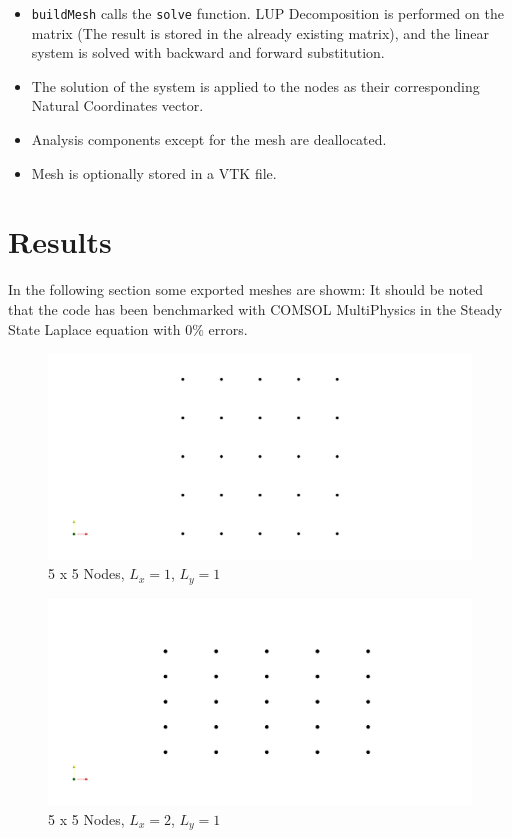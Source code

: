 \documentclass{article}
\begin{document}
\begin{itemize}
\begin{itemize}
 		
 			\end{itemize}
 			
 		
 			
 			\item \texttt{buildMesh} calls the \texttt{solve} function. LUP Decomposition is performed on the matrix (The result is stored in the already existing matrix), and the linear system is solved with backward and forward substitution.
 			\item The solution of the system is applied to the nodes as their corresponding Natural Coordinates vector.
 			\item Analysis components except for the mesh are deallocated.
 			\item Mesh is optionally stored in a VTK file.
 		
 		\end{itemize}
 	
 	\newpage
 	
 	\section{Results}
 	In the following section some exported meshes are showm: It should be noted that the code has been benchmarked with COMSOL MultiPhysics in the Steady State Laplace equation with $0\%$ errors.
 	
	\begin{figure}[H]
 		\includegraphics[height=1.0\textheight, width=1.05\textwidth, keepaspectratio]{./images/square_1_1_5_5.png}
 		\caption{5 x 5 Nodes, $L_x = 1$, $L_y = 1$}
 		\label{fig:square}
 	\end{figure}
 
 	\begin{figure}[H]
 	\includegraphics[height=1.0\textheight, width=1.05\textwidth, keepaspectratio]{./images/square_2_1_5_5.png}
 	\caption{5 x 5 Nodes, $L_x = 2$, $L_y = 1$}
 	\label{fig:parallelo}
 	\end{figure}
 
\end{document}
